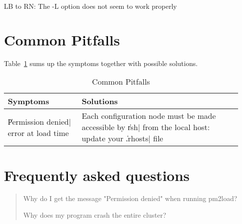 
\begin{note}
  LB to RN: The -L option does not seem to work properly
\end{note}


\section{Common Pitfalls}
\label{sec:commonpitfalls}

Table~\ref{tbl:pitfalls} sums up the symptoms together with
possible solutions.
\begin{table}[p]
\caption{Common Pitfalls\label{tbl:pitfalls}}
\begin{center}
\begin{tabular}{|p{0.30\linewidth}|p{0.65\linewidth}|}                          \hline
Symptoms & 
Solutions                   
\\ 
\hline
\|Permission denied| error at load time & 
Each configuration node must be made
accessible by \|rsh| from the local host: update your
\|.rhosts| file                                  
\\ 
\hline
\end{tabular}
\end{center}
\end{table}

\section{Frequently asked questions}
\label{sec:faq}


\begin{quote}
  Why do I get the message "Permission denied" when running pm2load?
  
  Why does my program crash the entire cluster?
\end{quote}
